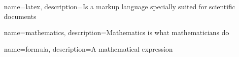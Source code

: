  {
	name=latex,
	description={Is a markup language specially suited for scientific documents}
}

 {
	name=mathematics,
	description={Mathematics is what mathematicians do}
}

 {
	name=formula,
	description={A mathematical expression}
}
